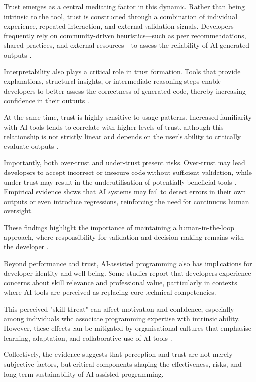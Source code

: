 \documentclass[conference]{IEEEtran}
\begin{document}
Trust emerges as a central mediating factor in this dynamic. Rather than being intrinsic to the tool, trust is constructed through a combination of individual experience, repeated interaction, and external validation signals. Developers frequently rely on community-driven heuristics—such as peer recommendations, shared practices, and external resources—to assess the reliability of AI-generated outputs \cite{cheng_it_2024}.

Interpretability also plays a critical role in trust formation. Tools that provide explanations, structural insights, or intermediate reasoning steps enable developers to better assess the correctness of generated code, thereby increasing confidence in their outputs \cite{palacio_towards_2025}.

At the same time, trust is highly sensitive to usage patterns. Increased familiarity with AI tools tends to correlate with higher levels of trust, although this relationship is not strictly linear and depends on the user's ability to critically evaluate outputs \cite{kuhail_will_2024}.

Importantly, both over-trust and under-trust present risks. Over-trust may lead developers to accept incorrect or insecure code without sufficient validation, while under-trust may result in the underutilisation of potentially beneficial tools \cite{vaillant_developers_2024, khojah_beyond_2024}. Empirical evidence shows that AI systems may fail to detect errors in their own outputs or even introduce regressions, reinforcing the need for continuous human oversight.

These findings highlight the importance of maintaining a human-in-the-loop approach, where responsibility for validation and decision-making remains with the developer \cite{cihan_evaluating_2025}.

Beyond performance and trust, AI-assisted programming also has implications for developer identity and well-being. Some studies report that developers experience concerns about skill relevance and professional value, particularly in contexts where AI tools are perceived as replacing core technical competencies.

This perceived "skill threat" can affect motivation and confidence, especially among individuals who associate programming expertise with intrinsic ability. However, these effects can be mitigated by organisational cultures that emphasise learning, adaptation, and collaborative use of AI tools \cite{hicks_new_2024}.

Collectively, the evidence suggests that perception and trust are not merely subjective factors, but critical components shaping the effectiveness, risks, and long-term sustainability of AI-assisted programming.
\end{document}
